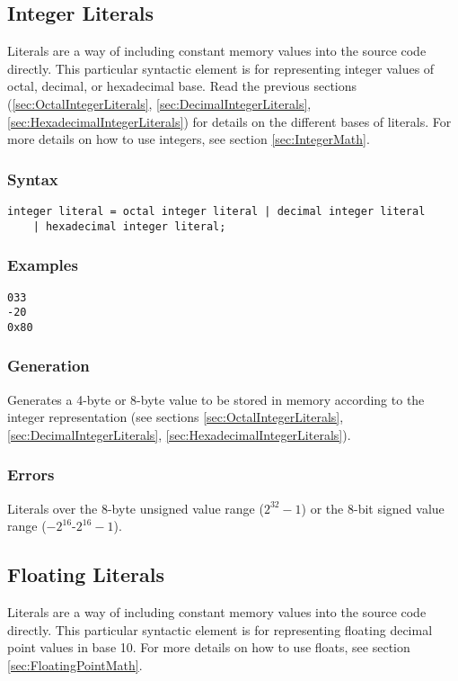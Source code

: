 \documentclass[10pt,a4paper]{article}
\begin{document}
\newpage




\subsection{Integer Literals}
Literals are a way of including constant memory values into the source code directly. This particular syntactic element is for representing integer values of octal, decimal, or hexadecimal base. Read the previous sections (\ref{sec:OctalIntegerLiterals}, \ref{sec:DecimalIntegerLiterals}, \ref{sec:HexadecimalIntegerLiterals}) for details on the different bases of literals. For more details on how to use integers, see section \ref{sec:IntegerMath}.

\subsubsection{Syntax}
\begin{verbatim}
integer literal = octal integer literal | decimal integer literal
    | hexadecimal integer literal;
\end{verbatim}

\subsubsection{Examples}
\begin{verbatim}
033
-20
0x80
\end{verbatim}

\subsubsection{Generation}
Generates a 4-byte or 8-byte value to be stored in memory according to the integer representation (see sections \ref{sec:OctalIntegerLiterals}, \ref{sec:DecimalIntegerLiterals}, \ref{sec:HexadecimalIntegerLiterals}).

\subsubsection{Errors}
Literals over the 8-byte unsigned value range ($2^{32}-1$) or the 8-bit signed value range ($-2^{16}$-$2^{16}-1$).

\newpage




\subsection{Floating Literals}
Literals are a way of including constant memory values into the source code directly. This particular syntactic element is for representing floating decimal point values in base 10. For more details on how to use floats, see section \ref{sec:FloatingPointMath}.
\end{document}
